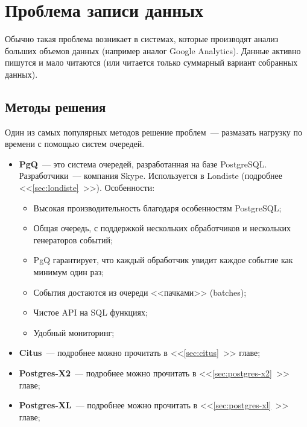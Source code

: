 \section{Проблема записи данных}

Обычно такая проблема возникает в системах, которые производят анализ больших объемов данных (например аналог Google Analytics). Данные активно пишутся и мало читаются (или читается только суммарный вариант собранных данных).

\subsection{Методы решения}

Один из самых популярных методов решение проблем~--- размазать нагрузку по времени с помощью систем очередей.

\begin{itemize}
  \item \textbf{PgQ}~--- это система очередей, разработанная на базе PostgreSQL. Разработчики~--- компания Skype. Используется в Londiste (подробнее <<\ref{sec:londiste}~>>). Особенности:

  \begin{itemize}
    \item Высокая производительность благодаря особенностям PostgreSQL;
    \item Общая очередь, с поддержкой нескольких обработчиков и нескольких генераторов событий;
    \item PgQ гарантирует, что каждый обработчик увидит каждое событие как минимум один раз;
    \item События достаются из очереди <<пачками>> (batches);
    \item Чистое API на SQL функциях;
    \item Удобный мониторинг;
  \end{itemize}

  \item \textbf{Citus}~--- подробнее можно прочитать в <<\ref{sec:citus}~>> главе;
  \item \textbf{Postgres-X2}~--- подробнее можно прочитать в <<\ref{sec:postgres-x2}~>> главе;
  \item \textbf{Postgres-XL}~--- подробнее можно прочитать в <<\ref{sec:postgres-xl}~>> главе;
\end{itemize}
